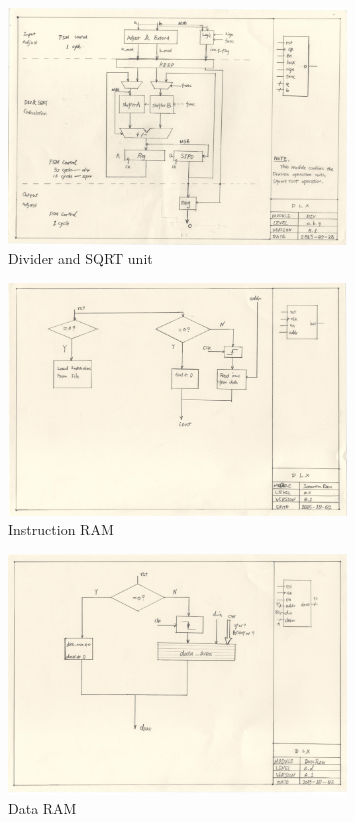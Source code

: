 \begin{figure}[Ht]
    \centering
    \includegraphics[width=0.8\textwidth]{fig/div.jpg}
    \caption{Divider and SQRT unit}
    \label{fig:div}
\end{figure}
\begin{figure}[Ht]
    \centering
    \includegraphics[width=0.8\textwidth]{fig/ir.jpg}
    \caption{Instruction RAM}
    \label{fig:ir}
\end{figure}
\begin{figure}[Ht]
    \centering
    \includegraphics[width=0.8\textwidth]{fig/dr.jpg}
    \caption{Data RAM}
    \label{fig:dr}
\end{figure}
